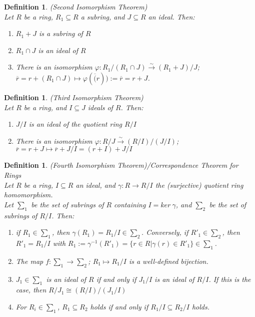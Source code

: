 \documentclass[a4paper,sfsidenotes,openany]{tufte-book}
\theoremstyle{theorem}
\newtheorem{definition}[theorem]{Definition}
\begin{document}
\begin{fullwidth}
\begin{definition}
\textit{{\color{blue} (Second Isomorphism Theorem)}}\\
Let $R$ be a ring, $R_1 \subseteq R$ a subring, and $J \subseteq R$ an ideal. Then:
\begin{enumerate}[label=(\roman*),leftmargin=0pt, itemindent=4em, align=left]
\item $R_1 + J$ is a subring of $R$
\item $R_1 \cap J$ is an ideal of $R$
\item There is an isomorphism $\varphi: R_1/(R_1 \cap J) \xrightarrow{\sim} (R_1 + J)/J$; $\overline{r} = r + (R_1 \cap J) \mapsto \varphi(\overline(r)) := \overline{r} = r+J$.\\
\end{enumerate}
\end{definition}
\>

\begin{definition}
\textit{{\color{blue} (Third Isomorphism Theorem)}}\\
Let $R$ be a ring, and $I \subseteq J$ ideals of $R$. Then: 
\begin{enumerate}[label=(\roman*),leftmargin=0pt, itemindent=4em, align=left]
\item $J/I$ is an ideal of the quotient ring $R/I$
\item There is an isomorphism $\varphi: R/J \xrightarrow{\sim} (R/I)/(J/I)$; $\overline{r}=r+J \mapsto \overline{r} + J/I = (r+I) + J/I$
\end{enumerate}
\end{definition}
\>

\begin{definition}
\textit{{\color{blue} (Fourth Isomorphism Theorem)}}/Correspondence Theorem for Rings\\
Let $R$ be a ring, $I \subseteq R$ an ideal, and $\gamma: R \rightarrow R/I$ the (surjective) quotient ring homomorphism.\\
Let $\sum_1$ be the set of subrings of $R$ containing $I = ker \ \gamma$, and $\sum_2$ be the set of subrings of $R/I$. Then:
\begin{enumerate}[label=(\roman*),leftmargin=0pt, itemindent=4em, align=left]
\item if $R_1 \in \sum_1$, then $\gamma(R_1) = R_1/I \in \sum_2$. Conversely, if $R'_1 \in \sum_2$, then $R'_1 = R_1/I$ with $R_1:=\gamma^{-1}(R'_1) = \{r\in R | \gamma(r) \in R'_1\} \in \sum_1$.
\item The map $f: \sum_1 \rightarrow \sum_2$; $R_1 \mapsto R_1/I$ is a well-defined bijection.
\item $J_1 \in \sum_1$ is an ideal of $R$ if and only if $J_1/I$ is an ideal of $R/I$. If this is the case, then $R/J_1 \cong (R/I)/(J_1/I)$
\item For $R_i \in \sum_1$, $R_1 \subseteq R_2$ holds if and only if $R_1/I \subseteq R_2/I$ holds.
\end{enumerate}
\end{definition}
\>


\end{fullwidth}
\end{document}
